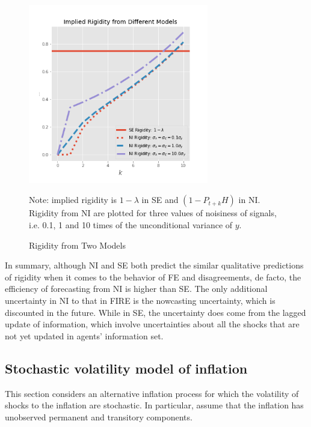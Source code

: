 \documentclass[12pt]{article}
\begin{document}
	\begin{figure}[ht]
		\centering
		\includegraphics[width=0.7\textwidth]{figures/rigidity.png} 
		\begin{flushleft}
			{\footnotesize Note: implied rigidity is $1-\lambda$ in SE and $(1-P_{t+k}H)$ in NI. Rigidity from NI are plotted for three values of noisiness of signals, i.e. 0.1, 1 and 10 times of the unconditional variance of $y$. }
		\end{flushleft}
		\caption{Rigidity from Two Models}
		\label{rigidity}
	\end{figure}
	
	In summary, although NI and SE both predict the similar qualitative predictions of rigidity when it comes to the behavior of FE and disagreements, de facto, the efficiency of forecasting from NI is higher than SE. The only additional uncertainty in NI to that in FIRE is the nowcasting uncertainty, which is discounted in the future. While in SE, the uncertainty does come from the lagged update of information, which involve uncertainties about all the shocks that are not yet updated in agents' information set. 
		
		
	
	\subsection{Stochastic volatility model of inflation}
	
	This section considers an alternative inflation process for which the volatility of shocks to the inflation are stochastic. In particular, assume that the inflation has unobserved permanent and transitory components. 
		
\end{document}
